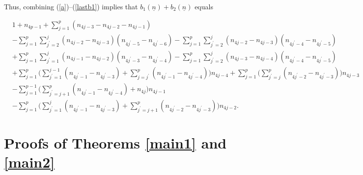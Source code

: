 \documentclass[11pt,reqno]{amsart}
\theoremstyle{definition}
\numberwithin{equation}{section}
\begin{document}
\noindent Thus, combining (\ref{a})--(\ref{lastb1}) implies that $b_1({\underline{n}}) + b_2({\underline{n}})$ equals

\begin{equation*}
\begin{aligned}
& 1 + n_{4p-1}  + \sum_{j=1}^{p} (n_{4j-3} - n_{4j-2} - n_{4j-1}) \\
& - \sum_{j=1}^{p} \sum_{j^{\prime}=2}^{j} (n_{4j-2} - n_{4j-3})(n_{4j^{\prime} - 5} - n_{4j^{\prime} - 6}) - \sum_{j=1}^{p} \sum_{j^{\prime}=2}^{j} (n_{4j-2} - n_{4j-3})(n_{4j^{\prime} -4} - n_{4j^{\prime} - 5}) \\
& + \sum_{j=1}^{p} \sum_{j^{\prime} = 1}^{j} (n_{4j-1} - n_{4j-2})(n_{4j^{\prime} - 3} - n_{4j^{\prime} - 4}) - \sum_{j=1}^{p} \sum_{j^{\prime}=2}^{j} (n_{4j-3} - n_{4j-4})(n_{4j^{\prime}-4} - n_{4j^{\prime} - 5}) \\
& + \sum_{j=1}^{p} \Biggl( \sum_{j^{\prime}=1}^{j-1} (n_{4j^{\prime} - 1} - n_{4j^{\prime} - 3}) + \sum_{j=j^{\prime}}^{p} (n_{4j^{\prime} - 1} - n_{4j^{\prime} - 4}) \Biggr) n_{4j-4} + \sum_{j=1}^{p} \Biggl( \sum_{j^{\prime} = j}^{p} (n_{4j^{\prime} - 2} - n_{4j^{\prime} - 3} ) \Biggr) n_{4j-3} \\
& - \sum_{j=1}^{p-1} \Biggl( \sum_{j^{\prime} = j+1}^{p} (n_{4j^{\prime} - 1} - n_{4j^{\prime} - 4}) + n_{4j}\Biggr) n_{4j-1} \\
& - \sum_{j=1}^{p} \Biggl( \sum_{j^{\prime}=1}^{j} (n_{4j^{\prime} - 1} - n_{4j^{\prime} - 3}) + \sum_{j^{\prime}=j+1}^{p} (n_{4j^{\prime} - 2} - n_{4j^{\prime} - 3}) \Biggr) n_{4j-2}.
\end{aligned}
\end{equation*}

\section{Proofs of Theorems \ref{main1} and \ref{main2}}
\end{document}
